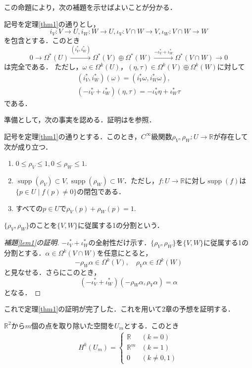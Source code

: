 \documentclass[uplatex]{jsarticle}
\begin{document}
この命題により，次の補題を示せばよいことが分かる．
\begin{lemma}\label{lem1}
記号を定理\ref{thm1}の通りとし，
\[ i_V\colon V\to U,  i_W\colon W\to U,  \iota_V\colon V\cap W\to V, \iota_W\colon V\cap W\to W \]
を包含とする．このとき
\[ 0\to\Omega^*(U)\stackrel{(i^*_V,i^*_W)}{\to}\Omega^*(V)\oplus\Omega^*(W)\stackrel{-\iota^*_V+\iota^*_W}{\to}\Omega^*(V\cap W)\to 0 \]
は完全である．
ただし，$\omega\in\Omega^k(U)$，$(\eta,\tau)\in\Omega^k(V)\oplus\Omega^k(W)$に対して
\begin{gather*}
 (i^*_V,i^*_W)(\omega)=(i^*_V\omega,i^*_W\omega), \\
 (-\iota^*_V+\iota^*_W)(\eta,\tau)=-\iota^*_V \eta+\iota^*_W \tau
\end{gather*}
である．
\end{lemma}
準備として，次の事実を認める．証明は\cite{松本}を参照．
\begin{proposition}
記号を定理\ref{thm1}の通りとする．このとき，$C^{\infty}$級関数$\rho_V,\rho_W\colon U\to \mathbb{R}$が存在して次が成り立つ．
\begin{enumerate}[label=(\roman*)]
\item $0 \leq \rho_V\leq 1, 0\leq \rho_W\leq 1.$
\item $\operatorname{supp}(\rho_V)\subset V, \operatorname{supp}(\rho_W)\subset W$．ただし，$f\colon U\to\mathbb{R}$に対し$\operatorname{supp}(f)$は$\{p\in U\mid f(p)\neq 0\}$の閉包である．
\item すべての$p\in U$で$\rho_V(p)+\rho_W(p)=1.$
\end{enumerate}
$\{\rho_V,\rho_W\}$のことを$\{V,W\}$に従属する1の分割という．
\end{proposition}
\begin{proof}[補題\ref{lem1}の証明]
$-\iota^*_V+\iota^*_W$の全射性だけ示す．$\{\rho_V,\rho_W\}$を$\{V,W\}$に従属する1の分割とする．$\alpha\in\Omega^k(V\cap W)$を任意にとると，
\[ -\rho_W\alpha\in\Omega^k(V),\quad \rho_V\alpha\in\Omega^k(W) \]
と見なせる．さらにこのとき，
\[ (-\iota^*_V+\iota^*_W)(-\rho_W\alpha,\rho_V\alpha)=\alpha \]
となる．
\end{proof}
これで定理\ref{thm1}の証明が完了した．これを用いて2章の予想を証明する．
\begin{theorem}
$\mathbb{R}^2$から$m$個の点を取り除いた空間を$U_m$とする．このとき
\begin{eqnarray*}
H^k(U_m)=
  \begin{cases}
    \mathbb{R} & (k=0)  \\
    \mathbb{R}^m &(k=1) \\
    0 & (k\neq 0,1)
  \end{cases}
\end{eqnarray*}
\end{theorem}
\end{document}
